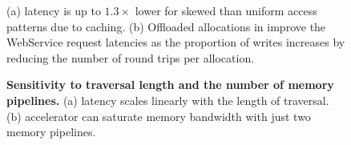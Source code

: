\begin{figure}[t]
\centering
{}
\caption[Impact of access pattern and modifications]{(a) \pulse latency is up to $1.3\times$ lower for skewed than uniform access patterns due to caching. (b) Offloaded allocations in \pulse improve the WebService request latencies as the proportion of writes increases by reducing the number of round trips per allocation.}
\label{fig:sup_eval_cache_friendly}
\end{figure}

\begin{figure}[!ht]
    \centering
    \caption[Sensitivity to traversal length and the number of memory pipelines]{\textbf{Sensitivity to traversal length and the number of memory pipelines.} (a) \pulse latency scales linearly with the length of traversal. (b) \pulse accelerator can saturate memory bandwidth with just two \pulse memory pipelines.}
\end{figure}
    

